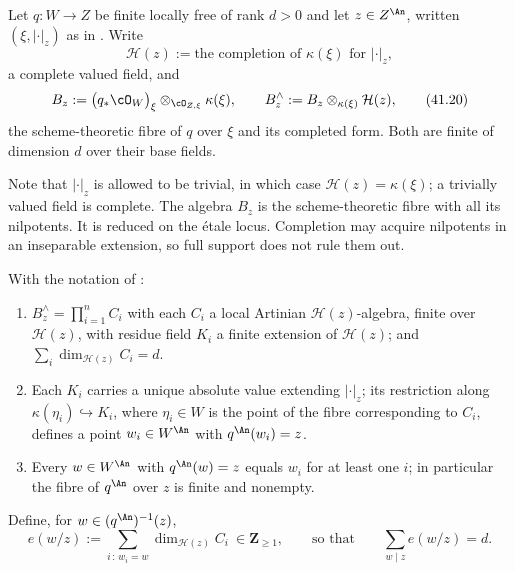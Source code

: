 \begin{definition}
\label{def:ch41-fibre-algebra}
Let $q:W\to Z$ be finite locally free of rank $d>0$ and let
$z\in Z^{\An}$, written $(\xi,|\cdot|_z)$ as in
.  Write
\[
 \mathcal H(z):=\text{the completion of }\kappa(\xi)
 \text{ for }|\cdot|_z ,
\]
a complete valued field, and
\[
 B_z:=\bigl(q_*\cO_W\bigr)_\xi\otimes_{\cO_{Z,\xi}}\kappa(\xi),
 \qquad
 B_z^{\wedge}:=B_z\otimes_{\kappa(\xi)}\mathcal H(z),
\tag{41.20}\label{eq:ch41-fibre-algebra}
\]
the scheme-theoretic fibre of $q$ over $\xi$ and its completed form.
Both are finite of dimension $d$ over their base fields.
\end{definition}

Note that $|\cdot|_z$ is allowed to be trivial, in which case
$\mathcal H(z)=\kappa(\xi)$; a trivially valued field is complete.  The
algebra $B_z$ is the scheme-theoretic fibre with all its nilpotents.
It is reduced on the étale locus.  Completion may acquire nilpotents
in an inseparable extension, so full support does not rule them out.

\begin{lemma}
\label{lem:ch41-fibre-decomposition}
With the notation of :
\begin{enumerate}
\item\label{itm:ch41-fd:decomp}
      $B_z^{\wedge}=\prod_{i=1}^{n}C_i$ with each $C_i$ a local
      Artinian $\mathcal H(z)$-algebra, finite over
      $\mathcal H(z)$, with residue field $K_i$ a finite extension of
      $\mathcal H(z)$; and
      $\sum_i\dim_{\mathcal H(z)}C_i=d$.
\item\label{itm:ch41-fd:unique}
      Each $K_i$ carries a unique absolute value extending
      $|\cdot|_z$; its restriction along
      $\kappa(\eta_i)\hookrightarrow K_i$, where $\eta_i\in W$ is the
      point of the fibre corresponding to $C_i$, defines a point
      $w_i\in W^{\An}$ with $q^{\An}(w_i)=z$.
\item\label{itm:ch41-fd:onto}
      Every $w\in W^{\An}$ with $q^{\An}(w)=z$ equals $w_i$ for at
      least one $i$; in particular the fibre of $q^{\An}$ over $z$ is
      finite and nonempty.
\end{enumerate}
Define, for $w\in(q^{\An})^{-1}(z)$,
\[
 e(w/z):=\sum_{i\,:\,w_i=w}\dim_{\mathcal H(z)}C_i
 \ \in\mathbf Z_{\ge1},
 \qquad\text{so that}\qquad
 \sum_{w\mid z}e(w/z)=d .
\tag{41.21}\label{eq:ch41-weights}
\]
\end{lemma}

